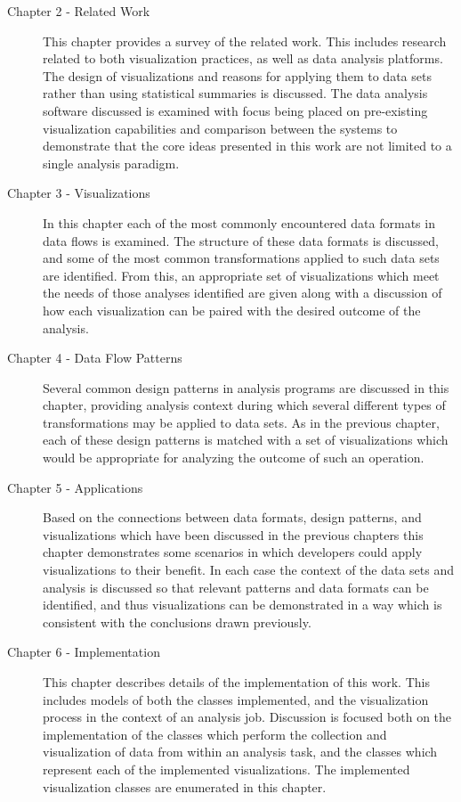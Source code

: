 \begin{description}
\item[Chapter 2 - Related Work] This chapter provides a survey of the related work. This includes research related to both visualization practices, as well as data analysis platforms. The design of visualizations and reasons for applying them to data sets rather than using statistical summaries is discussed. The data analysis software discussed is examined with focus being placed on pre-existing visualization capabilities and comparison between the systems to demonstrate that the core ideas presented in this work are not limited to a single analysis paradigm.
\\

\item[Chapter 3 - Visualizations] In this chapter each of the most commonly encountered data formats in data flows is examined. The structure of these data formats is discussed, and some of the most common transformations applied to such data sets are identified. From this, an appropriate set of visualizations which meet the needs of those analyses identified are given along with a discussion of how each visualization can be paired with the desired outcome of the analysis.
\\

\item[Chapter 4 - Data Flow Patterns] Several common design patterns in analysis programs are discussed in this chapter, providing analysis context during which several different types of transformations may be applied to data sets. As in the previous chapter, each of these design patterns is matched with a set of visualizations which would be appropriate for analyzing the outcome of such an operation.
\\

\item[Chapter 5 - Applications] Based on the connections between data formats, design patterns, and visualizations which have been discussed in the previous chapters this chapter demonstrates some scenarios in which developers could apply visualizations to their benefit. In each case the context of the data sets and analysis is discussed so that relevant patterns and data formats can be identified, and thus visualizations can be demonstrated in a way which is consistent with the conclusions drawn previously. 
\\

\item[Chapter 6 - Implementation] This chapter describes details of the implementation of this work. This includes models of both the classes implemented, and the visualization process in the context of an analysis job. Discussion is focused both on the implementation of the classes which perform the collection and visualization of data from within an analysis task, and the classes which represent each of the implemented visualizations. The implemented visualization classes are enumerated in this chapter. 
\\


\end{description}
